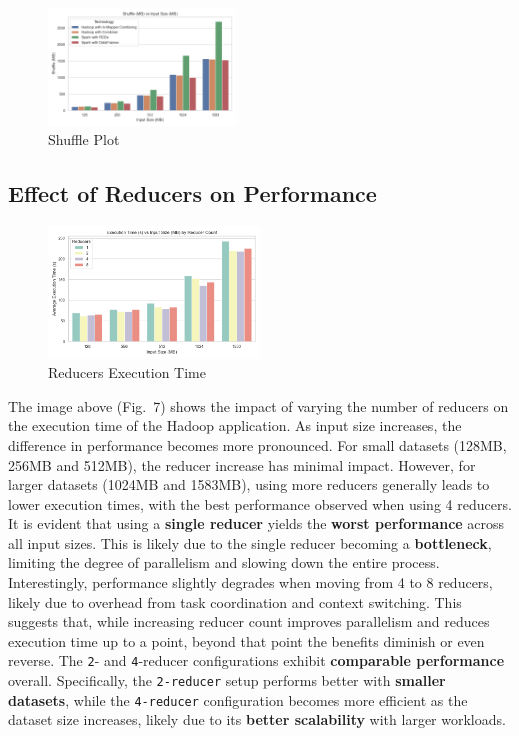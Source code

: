 \begin{figure}[H]
	\centering
	\includegraphics[width=0.444\textwidth]{images/Fig_Shuffle.png}
	\caption{Shuffle Plot}
	\label{fig:shuffle}
\end{figure}

\newpage

\subsection{Effect of Reducers on Performance}

\begin{figure}[H]
	\centering
	\includegraphics[width=0.5\textwidth]{images/Fig_Reducers_Execution_Time.png}
	\caption{Reducers Execution Time}
	\label{fig:reducer-execution-time}
\end{figure}

\vspace{-5.3mm}

The image above (Fig.~7) shows the impact of varying the number of reducers on the execution time of the Hadoop application.
As input size increases, the difference in performance becomes more pronounced. For small datasets (128MB, 256MB and 512MB), the reducer increase has minimal impact. However, for larger datasets (1024MB and 1583MB), using more reducers generally leads to lower execution times, with the best performance observed when using 4 reducers. It is evident that using a \textbf{single reducer} yields the \textbf{worst performance} across all input sizes. This is likely due to the single reducer becoming a \textbf{bottleneck}, limiting the degree of parallelism and slowing down the entire process. Interestingly, performance slightly degrades when moving from 4 to 8 reducers, likely due to overhead from task coordination and context switching. This suggests that, while increasing reducer count improves parallelism and reduces execution time up to a point, beyond that point the benefits diminish or even reverse. The \texttt{2}- and \texttt{4}-reducer configurations exhibit \textbf{comparable performance} overall. Specifically, the \texttt{2-reducer} setup performs better with \textbf{smaller datasets}, while the \texttt{4-reducer} configuration becomes more efficient as the dataset size increases, likely due to its \textbf{better scalability} with larger workloads.


